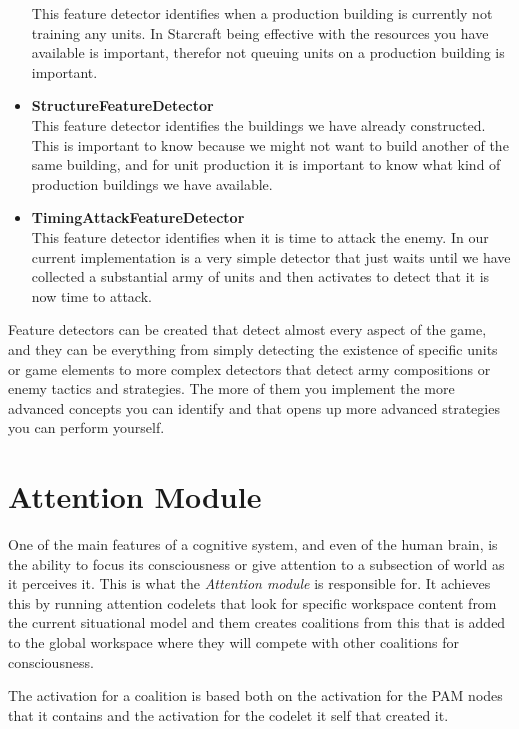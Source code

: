 \begin{itemize}
This feature detector identifies when a production building is currently not training any units. In Starcraft being effective with the resources you have available is important, therefor not queuing units on a production building is important.
\item \textbf{StructureFeatureDetector} \\
This feature detector identifies the buildings we have already constructed. This is important to know because we might not want to build another of the same building, and for unit production it is important to know what kind of production buildings we have available. 
\item \textbf{TimingAttackFeatureDetector} \\
This feature detector identifies when it is time to attack the enemy. In our current implementation is a very simple detector that just waits until we have collected a substantial army of units and then activates to detect that it is now time to attack.
\end{itemize}

Feature detectors can be created that detect almost every aspect of the game, and they can be everything from simply detecting the existence of specific units or game elements to more complex detectors that detect army compositions or enemy tactics and strategies. The more of them you implement the more advanced concepts you can identify and that opens up more advanced strategies you can perform yourself. 

\section{Attention Module}
One of the main features of a cognitive system, and even of the human brain, is the ability to focus its consciousness or give attention to a subsection of world as it perceives it. This is what the {\em Attention module} is responsible for. It achieves this by running attention codelets that look for specific workspace content from the current situational model and them creates coalitions from this that is added to the global workspace where they will compete with other coalitions for consciousness.

The activation for a coalition is based both on the activation for the PAM nodes that it contains and the activation for the codelet it self that created it. 

